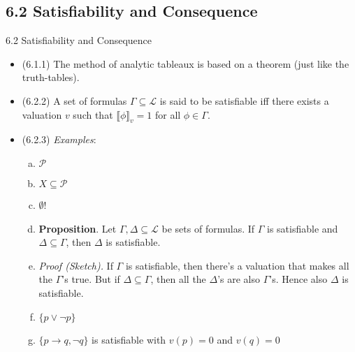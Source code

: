 \subsection{6.2 Satisfiability and Consequence}

\begin{frame}{6.2 Satisfiability and Consequence}

	\begin{itemize}
	
		\item (6.1.1) The method of analytic tableaux is based on a theorem (just like the truth-tables).
	
		\item	(6.2.2)  A set of formulas $\Gamma\subseteq\mathcal{L}$ is said to be satisfiable iff there exists a valuation $v$ such that $\llbracket\phi\rrbracket_v=1$ for all $\phi\in\Gamma$.
		
		\item (6.2.3) \emph{Examples}:
		
			\begin{enumerate}[(a)]
			
				\item $\mathcal{P}$
				
				\item $X\subseteq\mathcal{P}$
				
				\item$\emptyset$!
				
				\item \textbf{Proposition}. Let $\Gamma,\Delta\subseteq\mathcal{L}$ be sets of formulas. If $\Gamma$ is satisfiable and $\Delta\subseteq \Gamma$, then $\Delta$ is satisfiable.				
				\item[] \emph{Proof (Sketch).} If $\Gamma$ is satisfiable, then there's a valuation that makes all the $\Gamma$'s true. But if $\Delta\subseteq\Gamma$, then all the $\Delta$'s are also $\Gamma$'s. Hence also $\Delta$ is satisfiable.
			
				\item $\{p\lor\neg p\}$
			
				\item $\{p\to q, \neg q\}$ is satisfiable with $v(p)=0$ and $v(q)=0$
			
			\end{enumerate}
	
	\end{itemize}

\end{frame}

